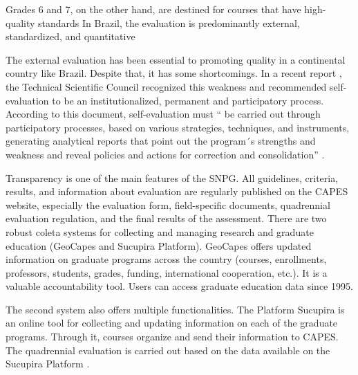  Grades 6 and 7, on the other hand, are destined for courses that have high-quality standards
In Brazil, the evaluation is predominantly external, standardized, and quantitative

The external evaluation has been essential to promoting quality in a continental country like Brazil. Despite that, it has some shortcomings. In a recent report \autocite{Faljoni-Alario.2018}, the Technical Scientific Council recognized this weakness and recommended self-evaluation to be an institutionalized, permanent and participatory process. According to this document, self-evaluation must “\textelp{} be carried out through participatory processes, based on various strategies, techniques, and instruments, generating analytical reports that point out the program´s strengths and weakness and reveal policies and actions for correction and consolidation” \autocite[19]{Faljoni-Alario.2018}.



Transparency is one of the main features of the SNPG. All guidelines, criteria, results, and information about evaluation are regularly published on the CAPES website, especially the evaluation form, field-specific documents, quadrennial evaluation regulation, and the final results of the assessment. There are two robust coleta systems for collecting and managing research and graduate education (GeoCapes and Sucupira Platform). GeoCapes offers updated information on graduate programs across the country (courses, enrollments, professors, students, grades, funding, international cooperation, etc.). It is a valuable accountability tool. Users can access graduate education data since 1995.

The second system also offers multiple functionalities. The Platform Sucupira is an online tool for collecting and updating information on each of the graduate programs. Through it, courses organize and send their information to CAPES. The quadrennial evaluation is carried out based on the data available on the Sucupira Platform \autocite{Brasil.2022, 122/2021}.